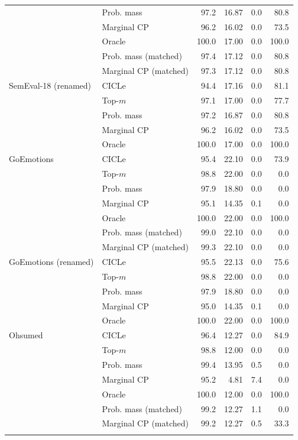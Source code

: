 \begin{tabular}{llrrrr}
 & Prob. mass & 97.2 & 16.87 & 0.0 & 80.8 \\
 & Marginal CP & 96.2 & 16.02 & 0.0 & 73.5 \\
 & Oracle & 100.0 & 17.00 & 0.0 & 100.0 \\
 & Prob. mass (matched) & 97.4 & 17.12 & 0.0 & 80.8 \\
 & Marginal CP (matched) & 97.3 & 17.12 & 0.0 & 80.8 \\
\addlinespace
SemEval-18 (renamed) & CICLe & 94.4 & 17.16 & 0.0 & 81.1 \\
 & Top-$m$ & 97.1 & 17.00 & 0.0 & 77.7 \\
 & Prob. mass & 97.2 & 16.87 & 0.0 & 80.8 \\
 & Marginal CP & 96.2 & 16.02 & 0.0 & 73.5 \\
 & Oracle & 100.0 & 17.00 & 0.0 & 100.0 \\
\addlinespace
GoEmotions & CICLe & 95.4 & 22.10 & 0.0 & 73.9 \\
 & Top-$m$ & 98.8 & 22.00 & 0.0 & 0.0 \\
 & Prob. mass & 97.9 & 18.80 & 0.0 & 0.0 \\
 & Marginal CP & 95.1 & 14.35 & 0.1 & 0.0 \\
 & Oracle & 100.0 & 22.00 & 0.0 & 100.0 \\
 & Prob. mass (matched) & 99.0 & 22.10 & 0.0 & 0.0 \\
 & Marginal CP (matched) & 99.3 & 22.10 & 0.0 & 0.0 \\
\addlinespace
GoEmotions (renamed) & CICLe & 95.5 & 22.13 & 0.0 & 75.6 \\
 & Top-$m$ & 98.8 & 22.00 & 0.0 & 0.0 \\
 & Prob. mass & 97.9 & 18.80 & 0.0 & 0.0 \\
 & Marginal CP & 95.0 & 14.35 & 0.1 & 0.0 \\
 & Oracle & 100.0 & 22.00 & 0.0 & 100.0 \\
\addlinespace
Ohsumed & CICLe & 96.4 & 12.27 & 0.0 & 84.9 \\
 & Top-$m$ & 98.8 & 12.00 & 0.0 & 0.0 \\
 & Prob. mass & 99.4 & 13.95 & 0.5 & 0.0 \\
 & Marginal CP & 95.2 & 4.81 & 7.4 & 0.0 \\
 & Oracle & 100.0 & 12.00 & 0.0 & 100.0 \\
 & Prob. mass (matched) & 99.2 & 12.27 & 1.1 & 0.0 \\
 & Marginal CP (matched) & 99.2 & 12.27 & 0.5 & 33.3 \\
\addlinespace

\end{tabular}
